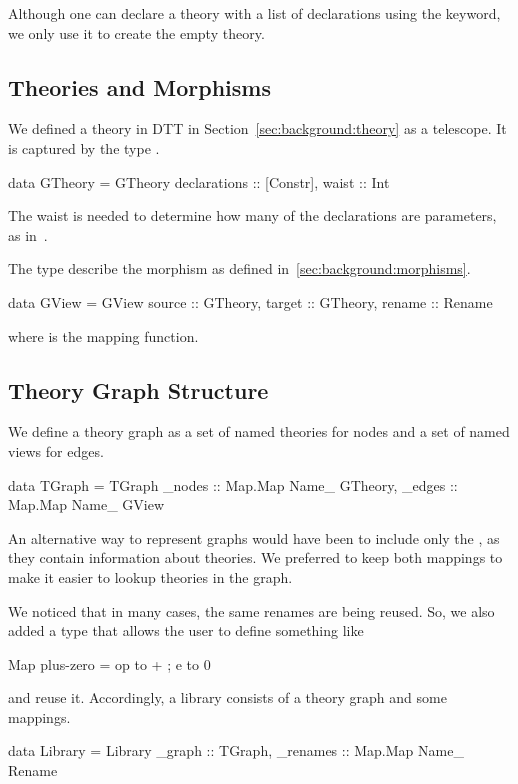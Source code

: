 Although one can declare a theory with a list of declarations using the  keyword, we only use it to create the empty theory. 


\subsection{Theories and Morphisms}
\label{subsec:theoriesMorphisms}
We defined a theory in DTT in Section~\ref{sec:background:theory} as a telescope.  It is captured by the type . 
\begin{hscode}
data GTheory = GTheory {
  declarations :: [Constr],
  waist        :: Int     }
\end{hscode}
The waist is needed to determine how many of the declarations are parameters, as in~\cite{alhassy2019}. 

The type  describe the morphism as defined in~\ref{sec:background:morphisms}. 
\begin{hscode}
data GView  = GView {
  source  :: GTheory,
  target  :: GTheory,
  rename :: Rename }  
\end{hscode}
\noindent where  is the mapping function. 

\subsection{Theory Graph Structure}
\label{subsec:graph}
We define a theory graph as a set of named theories for nodes and a set of named views for edges. 
\begin{hscode}
data TGraph = TGraph { 
  _nodes :: Map.Map Name_ GTheory,
  _edges :: Map.Map Name_ GView } 
\end{hscode}
An alternative way to represent graphs would have been to include only the , as they contain information about theories. We preferred to keep both mappings to make it easier to lookup theories in the graph. 

We noticed that in many cases, the same renames are being reused. So, we also added a  type that allows the user to define something like 
\begin{hscode}
Map plus-zero = {op to + ; e to 0}
\end{hscode}
\noindent and reuse it. Accordingly, a library consists of a theory graph and some mappings. 
\begin{hscode}
data Library = Library {
  _graph   :: TGraph,
  _renames :: Map.Map Name_ Rename }
\end{hscode}

